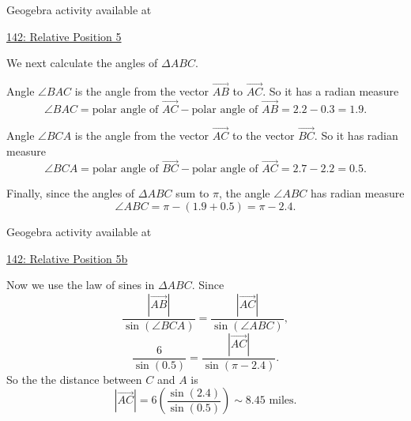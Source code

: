 \documentclass{ximera}
\begin{document}
\begin{example}
\begin{explanation}
Geogebra activity available at

\href{https://www.geogebra.org/classic/sn2cfjc4}{142: Relative Position 5}


We next calculate the angles of $\Delta ABC$. 

Angle $\angle BAC$ is the angle from the vector $\overrightarrow{AB}$ to $\overrightarrow{AC}$. So it has a radian measure 
\[
   \angle BAC = \text{polar angle of }\overrightarrow{AC} - \text{polar angle of }\overrightarrow{AB} = 2.2 - 0.3 = 1.9 .
\]


Angle $\angle BCA$ is the angle from the vector $\overrightarrow{AC}$ to the vector $\overrightarrow{BC}$. So it has radian measure
\[
   \angle BCA = \text{polar angle of }\overrightarrow{BC} - \text{polar angle of }\overrightarrow{AC} = 2.7 - 2.2 = 0.5 .
\]




Finally, since the angles of $\Delta ABC$ sum to $\pi$, the angle $\angle ABC$ has radian measure
\[
  \angle ABC = \pi - (1.9 + 0.5) = \pi -2.4.
\]


 
\begin{onlineOnly}
    \begin{center}
\end{center}
\end{onlineOnly}

Geogebra activity available at

\href{https://www.geogebra.org/classic/rbkfbjau}{142: Relative Position 5b}



Now we use the law of sines in $\Delta ABC$. Since
\[
   \frac{|\overrightarrow{AB}|}{\sin (\angle BCA)} =\frac{|\overrightarrow{AC}|}{\sin (\angle ABC)} ,
\]
\[
     \frac{6}{\sin (0.5)} =\frac{|\overrightarrow{AC}|}{\sin (\pi - 2.4)} .
\]
So the the distance between $C$ and $A$ is
\[
   |\overrightarrow{AC}| = 6  \left( \frac{\sin (2.4)}{\sin (0.5)} \right)  \sim 8.45 \text{ miles}.
\]


\end{explanation}
\end{example}
\end{document}
